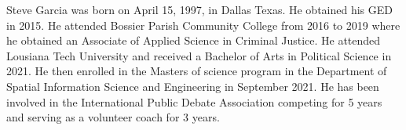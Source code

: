 \begin{biography}			%
Steve Garcia was born on April 15, 1997, in Dallas Texas. He obtained his GED in 2015. He attended Bossier Parish Community College from 2016 to 2019 where he obtained an Associate of Applied Science in Criminal Justice. He attended Lousiana Tech University and received a Bachelor of Arts in Political Science in 2021. He then enrolled in the Masters of science program in the Department of Spatial Information Science and Engineering in September 2021. He has been involved in the International Public Debate Association competing for 5 years and serving as a volunteer coach for 3 years.

\end{biography}

\endinput